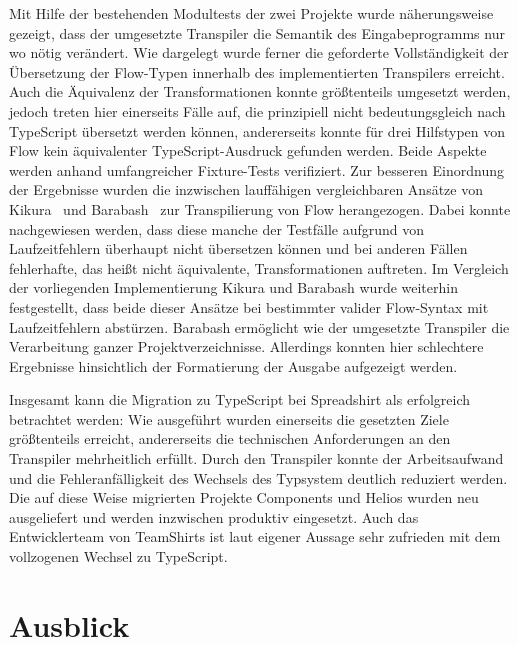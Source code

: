 Mit Hilfe der bestehenden Modultests der zwei Projekte wurde näherungsweise gezeigt, dass der umgesetzte Transpiler die Semantik des Eingabeprogramms nur wo nötig verändert. Wie dargelegt wurde ferner die geforderte Vollständigkeit der Übersetzung der Flow-Typen innerhalb des implementierten Transpilers erreicht. Auch die Äquivalenz der Transformationen konnte größtenteils umgesetzt werden, jedoch treten hier einerseits Fälle auf, die prinzipiell nicht bedeutungsgleich nach TypeScript übersetzt werden können, andererseits konnte für drei Hilfstypen von Flow kein äquivalenter TypeScript-Ausdruck gefunden werden. Beide Aspekte werden anhand umfangreicher Fixture-Tests verifiziert. Zur besseren Einordnung der Ergebnisse wurden die inzwischen lauffähigen vergleichbaren Ansätze von Kikura~\autocite{KIKURA:FLOW_TO_TS} und Barabash~\autocite{BARABASH:FLOW_TO_TS} zur Transpilierung von Flow herangezogen. Dabei konnte nachgewiesen werden, dass diese manche der Testfälle aufgrund von Laufzeitfehlern überhaupt nicht übersetzen können und bei anderen Fällen fehlerhafte, das heißt nicht äquivalente, Transformationen auftreten.
Im Vergleich der vorliegenden Implementierung Kikura und Barabash wurde weiterhin festgestellt, dass beide dieser Ansätze bei bestimmter valider Flow-Syntax mit Laufzeitfehlern abstürzen. Barabash ermöglicht wie der umgesetzte Transpiler die Verarbeitung ganzer Projektverzeichnisse. Allerdings konnten hier schlechtere Ergebnisse hinsichtlich der Formatierung der Ausgabe aufgezeigt werden.

Insgesamt kann die Migration zu TypeScript bei Spreadshirt als erfolgreich betrachtet werden: Wie ausgeführt wurden einerseits die gesetzten Ziele größtenteils erreicht, andererseits die technischen Anforderungen an den Transpiler mehrheitlich erfüllt. Durch den Transpiler konnte der Arbeitsaufwand und die Fehleranfälligkeit des Wechsels des Typsystem deutlich reduziert werden.
Die auf diese Weise migrierten Projekte Components und Helios wurden neu ausgeliefert und werden inzwischen produktiv eingesetzt. Auch das Entwicklerteam von TeamShirts ist laut eigener Aussage sehr zufrieden mit dem vollzogenen Wechsel zu TypeScript.

\section{Ausblick}

